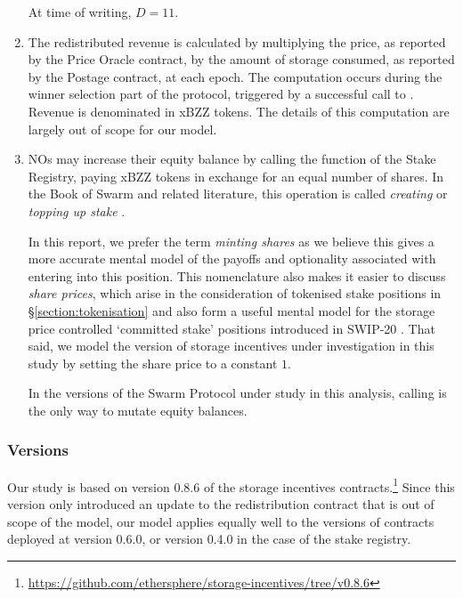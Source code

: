 \begin{enumerate}
    At time of writing, $D=11$.



  \item 
    The redistributed revenue is calculated by multiplying the price, as reported by the Price Oracle contract, by the amount of storage consumed, as reported by the Postage contract, at each epoch.
    The computation occurs during the winner selection part of the protocol, triggered by a successful call to .
    Revenue is denominated in xBZZ tokens.
    The details of this computation are largely out of scope for our model.
  
  \item 
    NOs may increase their equity balance by calling the  function of the Stake Registry, paying xBZZ tokens in exchange for an equal number of shares.
    In the Book of Swarm and related literature, this operation is called \emph{creating} or \emph{topping up stake} \cite[\S3.4.3]{book-of-swarm}.
    
    In this report, we prefer the term \emph{minting shares} as we believe this gives a more accurate mental model of the payoffs and optionality associated with entering into this position.
    This nomenclature also makes it easier to discuss \emph{share prices}, which arise in the consideration of tokenised stake positions in \S\ref{section:tokenisation} and also form a useful mental model for the storage price controlled `committed stake' positions introduced in SWIP-20 \cite{swip-20}.
    That said, we model the version of storage incentives under investigation in this study by setting the share price to a constant $1$.

    In the versions of the Swarm Protocol under study in this analysis, calling  is the only way to mutate equity balances.

\end{enumerate}

\subsubsection{Versions}
\label{section:versions}

Our study is based on version 0.8.6 of the storage incentives contracts.\footnote{\url{https://github.com/ethersphere/storage-incentives/tree/v0.8.6}}
%
Since this version only introduced an update to the redistribution contract that is out of scope of the model, our model applies equally well to the versions of contracts deployed at version 0.6.0, or version 0.4.0 in the case of the stake registry.



